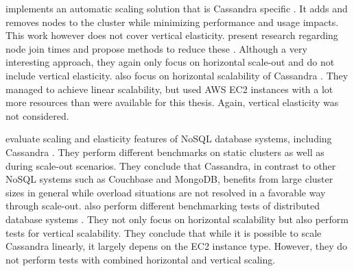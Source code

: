 \citeauthor{baakindAutomaticScalingCassandra2013} implements an automatic scaling solution that is Cassandra specific \cite{baakindAutomaticScalingCassandra2013}. It adds and removes nodes to the cluster while minimizing performance and usage impacts. This work however does not cover vertical elasticity. \citeauthor{miyokawaElasticityImprovementCassandra2016a} present research regarding node join times and propose methods to reduce these \cite{miyokawaElasticityImprovementCassandra2016a}. Although a very interesting approach, they again only focus on horizontal scale-out and do not include vertical elasticity. \citeauthor{cockroftBenchmarkingCassandraScalability2011} also focus on horizontal scalability of Cassandra \cite{cockroftBenchmarkingCassandraScalability2011}. They managed to achieve linear scalability, but used AWS EC2 instances with a lot more resources than were available for this thesis. Again, vertical elasticity was not considered.

\citeauthor{seyboldElasticityScalableDatabases2016} evaluate scaling and elasticity features of NoSQL database systems, including Cassandra \cite{seyboldElasticityScalableDatabases2016}. They perform different benchmarks on static clusters as well as during scale-out scenarios. They conclude that Cassandra, in contrast to other NoSQL systems such as Couchbase and MongoDB, benefits from large cluster sizes in general while overload situations are not resolved in a favorable way through scale-out. \citeauthor{kuhlenkampBenchmarkingScalabilityElasticity2014} also perform different benchmarking tests of distributed database systems \cite{kuhlenkampBenchmarkingScalabilityElasticity2014}. They not only focus on horizontal scalability but also perform tests for vertical scalability. They conclude that while it is possible to scale Cassandra linearly, it largely depens on the EC2 instance type. However, they do not perform tests with combined horizontal and vertical scaling.

